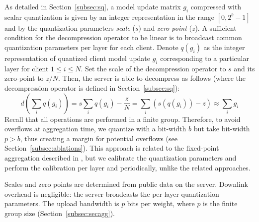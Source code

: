 As detailed in Section~\ref{subsec:sq}, a model update matrix $g_i$ compressed with scalar quantization is given by an integer representation in the range $[0, 2^{b}-1]$ and by the quantization parameters \emph{scale} ($s$) and \emph{zero-point} ($z$). A sufficient condition for the decompression operator to be linear is to broadcast common quantization parameters per layer for each client. Denote $q(g_i)$ as the integer representation of quantized client model update $g_i$ corresponding to a particular layer for client $1\leq i \leq N$.
Set the scale of the decompression operator to $s$ and its zero-point to $z/N$.
Then, the server is able to decompress as follows (where the decompression operator is defined in Section~\ref{subsec:sq}):
\begin{equation*}\textstyle
    d\left(\sum_i q(g_i)\right) = s\sum_i  q(g_i) -  \frac{z}{N}  = \sum_i \left( s(q(g_i)) - z \right) \approx \sum_i g_i
\end{equation*}
Recall that all operations are performed in a finite group. Therefore, to avoid overflows at aggregation time, we quantize with a bit-width $b$ but take \SecAgg bit-width $p > b$, thus creating a margin for potential overflows (see Section~\ref{subsec:ablations}).
%
This approach is related to the fixed-point aggregation described in \cite{bonavitz2019federated,huba2021papaya}, but we calibrate the quantization parameters and perform the calibration per layer and periodically, unlike the related approaches.

 Scales and zero points are determined from public data on the server. Downlink overhead is negligible: the server broadcasts the per-layer quantization parameters. The upload bandwidth is $p$ bits per weight, where $p$ is the \SecAgg finite group size (Section~\ref{subsec:secagg}). 

